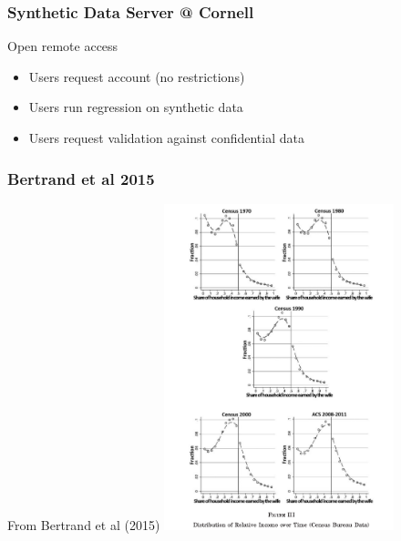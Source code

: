 \begin{frame}
	\frametitle{Synthetic Data Server @ Cornell}
	\begin{block}{Open remote access}
		\begin{itemize}
			\item Users request account (no restrictions)
			\item Users run regression on synthetic data
			\item Users request validation against confidential data
		\end{itemize}
	\end{block}
\end{frame}

\begin{frame}
	\frametitle{Bertrand et al 2015}
	\begin{block}{From Bertrand et al (2015)}
		\centering
	\includegraphics[width=0.5\textwidth]{Bertrand-QJE-2015-FigureIII}
\end{block}
\end{frame}




